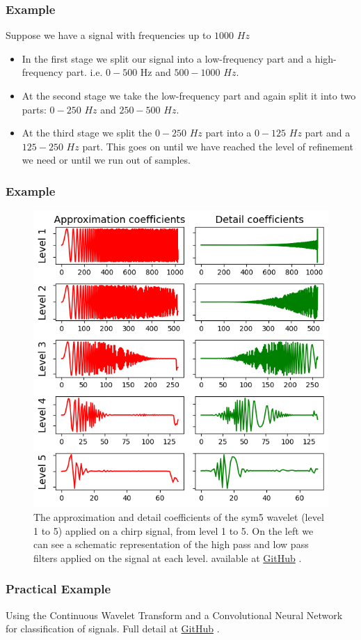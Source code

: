 \documentclass{beamer}
\newcommand{\github}{
\href{https://github.com/A-M-Kharazi/Machine-Learning-TMU}{GitHub}
}
\begin{document}
\begin{frame}
	\frametitle{Example}
	Suppose we have a signal with frequencies up to $1000$ $Hz$
	
	\begin{itemize}
		\item
		In the first stage we split our signal into a low-frequency part and a high-frequency part. i.e. $0-500$ Hz and $500-1000$ $Hz$.
		\item
		At the second stage we take the low-frequency part and again split it into two parts: $0-250$ $Hz$ and $250-500$ $Hz$.
		\item
		At the third stage we split the $0-250$ $Hz$ part into a $0-125$ $Hz$ part and a $125-250$ $Hz$ part.
		This goes on until we have reached the level of refinement we need or until we run out of samples.
	
	\end{itemize}
	
	
\end{frame}

\begin{frame}
	\frametitle{Example}
	\begin{center}
		\begin{figure}\label{fig8}
			\includegraphics[scale=0.3]{multilevel_coefficients_schematic.png}
			\caption{The approximation and detail coefficients of the sym5 wavelet (level 1 to 5) applied on a chirp signal, from level 1 to 5. On the left we can see a schematic representation of the high pass and low pass filters applied on the signal at each level. available at \github.}
		\end{figure}
	\end{center}
\end{frame}


\begin{frame}
	\frametitle{Practical Example}
	
	Using the Continuous Wavelet Transform and a Convolutional Neural Network for classification of signals. Full detail at \github.
	
\end{frame}






	
	
\end{document}
